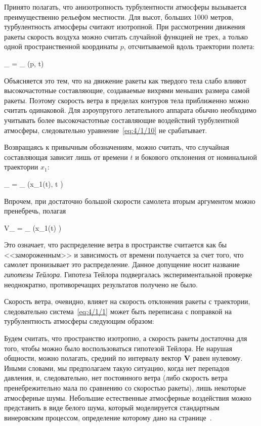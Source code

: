 Принято полагать, что анизотропность турбулентности атмосферы вызывается преимущественно рельефом местности. Для высот, больших 1000 метров, турбулентность атмосферы считают изотропной. При рассмотрении движения ракеты скорость воздуха можно считать случайной функцией не трех, а только одной пространственной координаты $p$, отсчитываемой вдоль траектории полета:

    _{} = _{} (p, t) 
\eeq

Объясняется это тем, что на движение ракеты как твердого тела слабо влияют высокочастотные составляющие\cite{KRASOVSKY}, создаваемые вихрями меньших размера самой ракеты. Поэтому скорость ветра в пределах контуров тела приближенно можно считать одинаковой. Для аэроупругого летательного аппарата обычно необходимо учитывать более высокочастотные составляющие воздействий турбулентной атмосферы, следовательно уравнение~\ref{eq:4/1/10} не срабатывает.

Возвращаясь к привычным обозначениям, можно считать, что случайная составляющая зависит лишь от времени $t$ и бокового отклонения от номинальной траектории $x_1$:

    _{} = _{} \bigl(x_1(t), t \bigr) 
\eeq

Впрочем, при достаточно большой скорости самолета вторым аргументом можно пренебречь, полагая

    V_{} = _{} \bigl(x_1(t) \bigr) 
\eeq

Это означает, что распределение ветра в пространстве считается как бы <<замороженным>> и зависимость от времени получается за счет того, что самолет пронизывает это распределение. Данное допущение носит название \emph{гипотезы Тейлора}\cite{MONIN}. Гипотеза Тейлора подвергалась экспериментальной проверке неоднократно, противоречащих результатов получено не было.

Скорость ветра, очевидно, влияет на скорость отклонения ракеты с траектории, следовательно система~\vref{eq:4/1/1} может быть переписана с поправкой на турбулентность атмосферы следующим образом:

\eeq

Будем считать, что пространство изотропно, а скорость ракеты достаточна для того, чтобы можно было воспользоваться гипотезой Тейлора. Не нарушая общности, можно полагать, средний по интервалу вектор $\mathbf{V}$ равен нулевому. Иными словами, мы предполагаем такую ситуацию, когда нет перепадов давления, и, следовательно, нет постоянного ветра (либо скорость ветра пренебрежительно мала по сравнению со скоростью ракеты), лишь некоторые атмосферные шумы. Небольшие естественные атмосферные воздействия можно представить в виде белого шума, который моделируется стандартным винеровским процессом, определение которому дано на странице~\pageref{df:6}.

